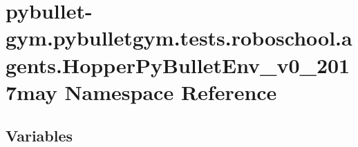 \hypertarget{namespacepybullet-gym_1_1pybulletgym_1_1tests_1_1roboschool_1_1agents_1_1_hopper_py_bullet_env__v0__2017may}{}\section{pybullet-\/gym.pybulletgym.\+tests.\+roboschool.\+agents.\+Hopper\+Py\+Bullet\+Env\+\_\+v0\+\_\+2017may Namespace Reference}
\label{namespacepybullet-gym_1_1pybulletgym_1_1tests_1_1roboschool_1_1agents_1_1_hopper_py_bullet_env__v0__2017may}
\subsection*{Variables}
